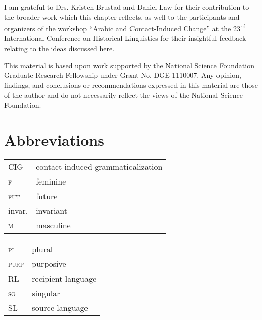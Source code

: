 \documentclass[output=paper]{langsci/langscibook}
\begin{document}
I am grateful to Drs. Kristen Brustad and Daniel Law for their contribution to the broader work which this chapter reflects, as well to the participants and organizers of the workshop “Arabic and Contact-Induced Change” at the 23\textsuperscript{rd} International Conference on Historical Linguistics for their insightful feedback relating to the ideas discussed here.

This material is based upon work supported by the National Science Foundation Graduate Research Fellowship under Grant No. DGE-1110007. Any opinion, findings, and conclusions or recommendations expressed in this material are those of the author and do not necessarily reflect the views of the National Science Foundation.

\section*{Abbreviations}


\begin{tabularx}{.5\textwidth}{@{}lQ@{}}
CIG & contact induced grammaticalization \\
\textsc{f} & feminine \\
\textsc{fut} & future \\
invar. & invariant \\
\textsc{m} & masculine \\
\end{tabularx}%
\begin{tabularx}{.5\textwidth}{@{}lQ@{}}
\textsc{pl} & plural \\
\textsc{purp} & purposive \\
RL & recipient language \\
\textsc{sg} & singular \\
SL & source language \\
\end{tabularx}%



\sloppy
\printbibliography[heading=subbibliography,notkeyword=this] 
\end{document}
